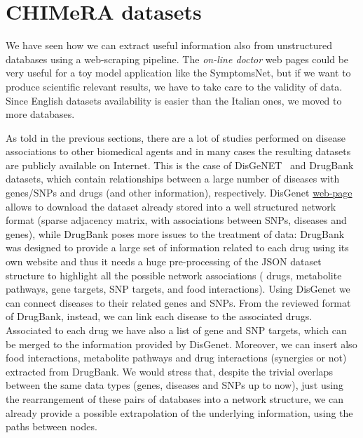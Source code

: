 \documentclass{standalone}
\begin{document}
\section[Dataset]{CHIMeRA datasets}\label{chimera:net}

We have seen how we can extract useful information also from unstructured databases using a \textsf{web-scraping} pipeline.
The \emph{on-line doctor} web pages could be very useful for a toy model application like the \textsf{SymptomsNet}, but if we want to produce scientific relevant results, we have to take care to the validity of data.
Since English datasets availability is easier than the Italian ones, we moved to more  databases.

As told in the previous sections, there are a lot of studies performed on disease associations to other biomedical agents and in many cases the resulting datasets are publicly available on Internet.
This is the case of DisGeNET~\cite{DisGeNet} and DrugBank~\cite{DrugBank} datasets, which contain relationships between a large number of diseases with genes/SNPs and drugs (and other information), respectively.
DisGenet \href{https://doi.org/10.1093/nar/gkw943}{web-page} allows to download the dataset already stored into a well structured network format (sparse adjacency matrix, with  associations between  SNPs,  diseases and  genes), while DrugBank poses more issues to the treatment of data: DrugBank was designed to provide a large set of information related to each drug using its own website and thus it needs a huge pre-processing of the JSON dataset structure to highlight all the possible network associations ( drugs,  metabolite pathways,  gene targets,  SNP targets, and  food interactions).
Using DisGenet we can connect diseases to their related genes and SNPs.
From the reviewed format of DrugBank, instead, we can link each disease to the associated drugs.
Associated to each drug we have also a list of gene and SNP targets, which can be merged to the information provided by DisGenet.
Moreover, we can insert also food interactions, metabolite pathways and drug interactions (synergies or not) extracted from DrugBank.
We would stress that, despite the trivial overlaps between the same data types (genes, diseases and SNPs up to now), just using the rearrangement of these pairs of databases into a network structure, we can already provide a possible extrapolation of the underlying information, using the paths between nodes.
\end{document}
